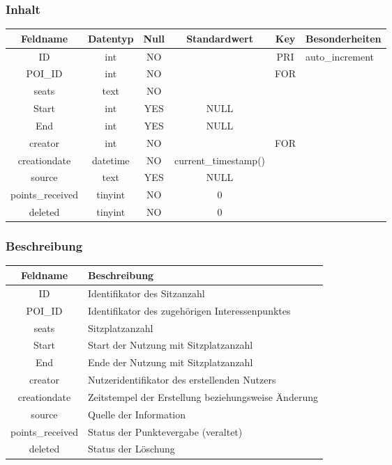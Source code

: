 \subsubsection{Inhalt}
\begin{table}[H]
	\begin{tabular}{|c|c|c|c|c|p{3.5cm}|}
		\hline
		\textbf{Feldname} & \textbf{Datentyp} & \textbf{Null} & \textbf{Standardwert} & \textbf{Key}   & \textbf{Besonderheiten} \\ \hline
		ID & int & NO &  & PRI & auto\_increment \\ \hline
 		POI\_ID & int & NO &  & FOR & \\ \hline
		seats & text & NO &  &  & \\ \hline
		Start & int & YES & NULL &  & \\ \hline
		End & int & YES & NULL &  & \\ \hline
		creator & int & NO &  & FOR & \\ \hline
		creationdate & datetime & NO & current\_timestamp() &  & \\ \hline
		source & text & YES & NULL &  & \\ \hline
		points\_received & tinyint & NO & 0 &  & \\ \hline
		deleted & tinyint & NO & 0 &  & \\ \hline
	\end{tabular}
\end{table}
\subsubsection{Beschreibung}
\begin{table}[H]
	\begin{tabular}{|c|p{12cm}|}
		\hline
		\textbf{Feldname} & \textbf{Beschreibung} \\ \hline
		ID & Identifikator des Sitzanzahl \\ \hline
		POI\_ID & Identifikator des zugehörigen Interessenpunktes \\ \hline
		seats & Sitzplatzanzahl \\ \hline
		Start & Start der Nutzung mit Sitzplatzanzahl \\ \hline
		End & Ende der Nutzung mit Sitzplatzanzahl \\ \hline
		creator & Nutzeridentifikator des erstellenden Nutzers \\ \hline
		creationdate & Zeitstempel der Erstellung beziehungsweise Änderung\\ \hline
		source & Quelle der Information \\ \hline
		points\_received & Status der Punktevergabe (veraltet) \\ \hline
		deleted & Status der Löschung \\ \hline
	\end{tabular}
\end{table}
